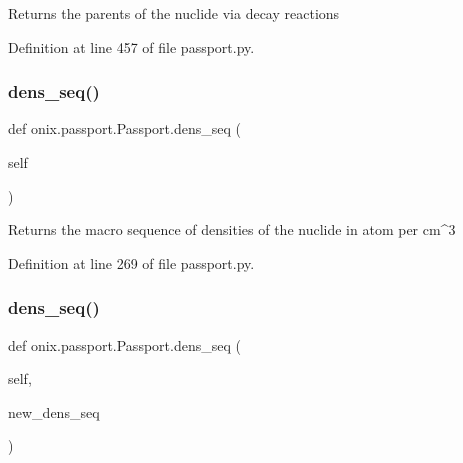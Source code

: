 \begin{DoxyVerb}Returns the parents of the nuclide via decay reactions\end{DoxyVerb}
 

Definition at line 457 of file passport.\+py.

\mbox{\label{classonix_1_1passport_1_1Passport_ab3fb63fcada645c44aad3f0b1c2718b0}} 
\subsubsection{\texorpdfstring{dens\+\_\+seq()}{dens\_seq()}\hspace{0.1cm}{\footnotesize\ttfamily [1/2]}}
{\footnotesize\ttfamily def onix.\+passport.\+Passport.\+dens\+\_\+seq (\begin{DoxyParamCaption}\item[{}]{self }\end{DoxyParamCaption})}

\begin{DoxyVerb}Returns the macro sequence of densities of the nuclide in atom per cm^3\end{DoxyVerb}
 

Definition at line 269 of file passport.\+py.

\mbox{\label{classonix_1_1passport_1_1Passport_a09304f9d31d64322601f8dd5a8da8033}} 
\subsubsection{\texorpdfstring{dens\+\_\+seq()}{dens\_seq()}\hspace{0.1cm}{\footnotesize\ttfamily [2/2]}}
{\footnotesize\ttfamily def onix.\+passport.\+Passport.\+dens\+\_\+seq (\begin{DoxyParamCaption}\item[{}]{self,  }\item[{}]{new\+\_\+dens\+\_\+seq }\end{DoxyParamCaption})}

